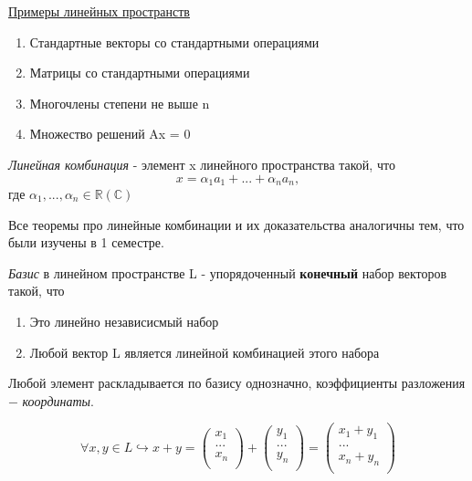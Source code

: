 \underline{Примеры линейных пространств}
\begin{enumerate}
    \item Стандартные векторы со стандартными операциями
    \item Матрицы со стандартными операциями
    \item Многочлены степени не выше n
    \item Множество решений Ax = 0
\end{enumerate}

\begin{definition}
    \textit{Линейная комбинация} - элемент x линейного пространства такой, что
    \[
    x = \alpha_1a_1 + ... + \alpha_na_n,
    \]
    где $\alpha_1, ..., \alpha_n \in \mathbb{R}(\mathbb{C})$
\end{definition}

Все теоремы про линейные комбинации и их доказательства аналогичны тем, что  были изучены в 1 семестре.\\

\begin{definition}
    \textit{Базис} в линейном пространстве L - упорядоченный \textbf{конечный} набор векторов такой, что
    \begin{enumerate}
        \item Это линейно независисмый набор
        \item Любой вектор L является линейной комбинацией этого набора
    \end{enumerate}
\end{definition}

Любой элемент раскладывается по базису однозначно, коэффициенты разложения $-$ \textit{координаты}.\\

\begin{theorem}
    \[
    \forall x, y \in L \hookrightarrow x + y = 
    \begin{pmatrix}
        x_1\\
        ...\\
        x_n\\
    \end{pmatrix} + 
    \begin{pmatrix}
        y_1\\
        ...\\
        y_n\\
    \end{pmatrix} = 
    \begin{pmatrix}
        x_1 + y_1\\
        ...\\
        x_n + y_n\\
    \end{pmatrix}
    \]
\end{theorem}

